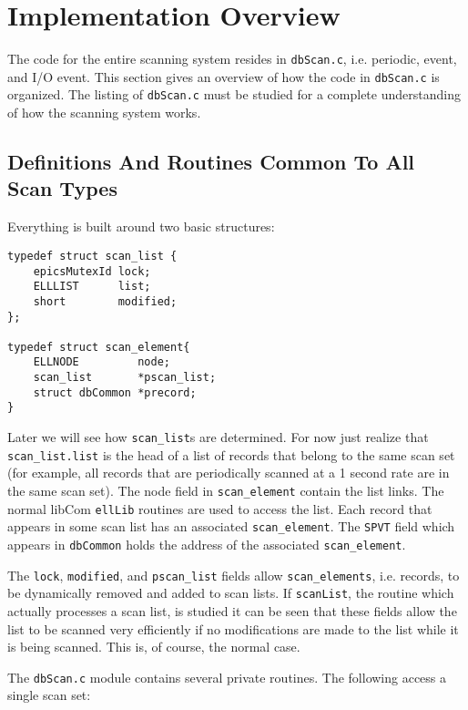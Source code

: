 \section{Implementation Overview}

The code for the entire scanning system resides in \verb|dbScan.c|, i.e. periodic, event, and I/O event. This section gives an 
overview of how the code in \verb|dbScan.c| is organized. The listing of \verb|dbScan.c| must be studied for a complete 
understanding of how the scanning system works.

\subsection{Definitions And Routines Common To All Scan Types}

Everything is built around two basic structures:

\begin{verbatim}
typedef struct scan_list {
    epicsMutexId lock;
    ELLLIST      list;
    short        modified;
};

typedef struct scan_element{
    ELLNODE         node;
    scan_list       *pscan_list;
    struct dbCommon *precord;
}
\end{verbatim}

Later we will see how \verb|scan_list|s are determined. For now just realize that \verb|scan_list.list| is the head of a list of 
records that belong to the same scan set (for example, all records that are periodically scanned at a 1 second rate are in the 
same scan set). The node field in \verb|scan_element| contain the list links. The normal libCom \verb|ellLib| routines are used 
to access the list. Each record that appears in some scan list has an associated \verb|scan_element|. The \verb|SPVT| field which 
appears in \verb|dbCommon| holds the address of the associated \verb|scan_element|.

The \verb|lock|, \verb|modified|, and \verb|pscan_list| fields allow \verb|scan_elements|, i.e. records, to be dynamically removed and 
added to scan lists. If \verb|scanList|, the routine which actually processes a scan list, is studied it can be seen that these fields 
allow the list to be scanned very efficiently if no modifications are made to the list while it is being scanned. This is, of 
course, the normal case.

The \verb|dbScan.c| module contains several private routines. The following access a single scan set: 

